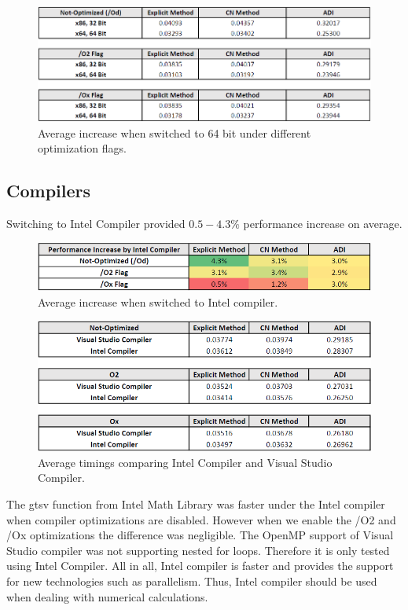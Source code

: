 \documentclass[12pt, oneside]{book}
\theoremstyle{plain}
\theoremstyle{definition}
\begin{document}
\begin{figure}[!htb]
    \centering
        \includegraphics[scale=0.7]{bit.png}
    \caption{Average increase when switched to 64 bit under different optimization flags.}
\end{figure}

\subsection{Compilers} 
Switching to Intel Compiler provided $0.5 - 4.3 \%$ performance increase on average. 

\begin{figure}[!htb]
    \centering
        \includegraphics[scale=0.8]{compilerPercent.png}
    \caption{Average increase when switched to Intel compiler.}
\end{figure}

\begin{figure}[!htb]
    \centering
        \includegraphics[scale=0.8]{compilerT.png}
    \caption{Average timings comparing Intel Compiler and Visual Studio Compiler.}
\end{figure}


The gtsv function from Intel Math Library was faster under the Intel compiler when compiler optimizations are disabled. However when we enable the /O2 and /Ox optimizations the difference was negligible. The OpenMP support of Visual Studio compiler was not supporting nested for loops. Therefore it is only tested using Intel Compiler. All in all, Intel compiler is faster and provides the support for new technologies such as parallelism. Thus, Intel compiler should be used when dealing with numerical calculations.
\end{document}
